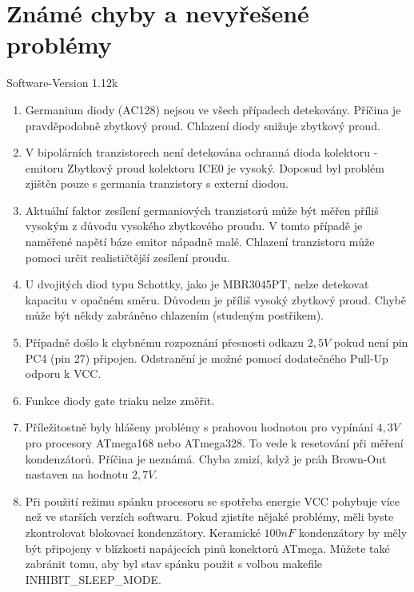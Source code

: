\chapter{Známé chyby a nevyřešené problémy}
\vspace*{-1cm}
{\center Software-Version 1.12k}

\begin{enumerate} \setlength{\itemsep}{0em}

\item Germanium diody (AC128) nejsou ve všech případech detekovány. Příčina je pravděpodobně zbytkový proud.
Chlazení diody snižuje zbytkový proud.

\item V bipolárních tranzistorech není detekována ochranná dioda kolektoru - emitoru
Zbytkový proud kolektoru ICE0 je vysoký. Doposud byl problém zjištěn pouze s germania tranzistory s
externí diodou.

\item Aktuální faktor zesílení germaniových tranzistorů může být měřen příliš vysokým z důvodu vysokého zbytkového proudu.
V tomto případě je naměřené napětí báze emitor nápadně malé.
Chlazení tranzistoru může pomoci určit realističtější zesílení proudu.

\item U dvojitých diod typu Schottky, jako je MBR3045PT, nelze detekovat kapacitu v opačném směru. Důvodem je příliš vysoký zbytkový proud. Chybě může být někdy zabráněno chlazením (studeným postřikem).

\item Případně došlo k chybnému rozpoznání přesnosti odkazu \(2,5V\) pokud není pin PC4 (pin 27) připojen.
Odstranění je možné pomocí dodatečného Pull-Up odporu k VCC.

\item Funkce diody gate triaku nelze změřit.

\item Příležitostně byly hlášeny problémy s prahovou hodnotou pro vypínání \(4,3V\) pro procesory ATmega168 nebo ATmega328. To vede k resetování při měření kondenzátorů. Příčina je neznámá.
Chyba zmizí, když je práh Brown-Out nastaven na hodnotu \(2,7V\).

\item Při použití režimu spánku procesoru se spotřeba energie VCC pohybuje více než
ve starších verzích softwaru.
Pokud zjistíte nějaké problémy, měli byste zkontrolovat blokovací kondenzátory.
Keramické \(100nF\) kondenzátory by měly být připojeny v blízkosti napájecích pinů konektorů ATmega.
Můžete také zabránit tomu, aby byl stav spánku použit s volbou makefile INHIBIT\_SLEEP\_MODE.


\end{enumerate}
